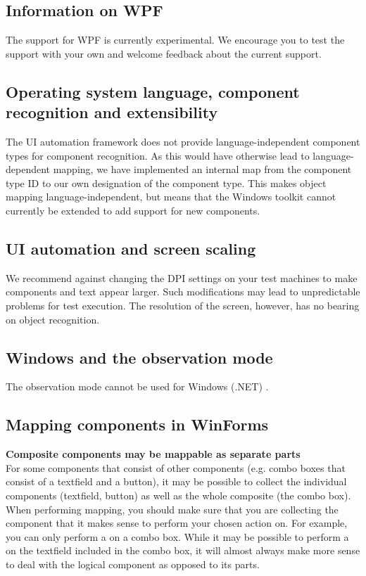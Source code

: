 \subsection{Information on WPF \gdauts{}}
The support for WPF \gdauts{} is currently experimental. We encourage you to test the support with your own \gdauts{} and welcome feedback about the current support.

\subsection{Operating system language, component recognition and extensibility}
The UI automation framework does not provide language-independent component types for component recognition. As this would have otherwise lead to language-dependent mapping, we have implemented an internal map from the component type ID to our own designation of the component type. This makes object mapping language-independent, but means that the Windows toolkit cannot currently be extended to add support for new components. 

\subsection{UI automation and screen scaling}
We recommend against changing the DPI settings on your test machines to make components and text appear larger. Such modifications may lead to unpredictable problems for test execution. The resolution of the screen, however, has no bearing on object recognition. 

\subsection{Windows \gdauts{} and the observation mode}
The observation mode cannot be used for Windows (.NET) \gdauts{}. 

\subsection{Mapping components in WinForms\gdauts{}}

\textbf{Composite components may be mappable as separate parts}\\
For some components that consist of other components (e.g. combo boxes that consist of a textfield and a button), it may be possible to collect the individual components (textfield, button) as well as the whole composite (the combo box). When performing mapping, you should make sure that you are collecting the component that it makes sense to perform your chosen action on. For example, you can only perform a  on a combo box. While it may be possible to perform a  on the textfield included in the combo box, it will almost always make more sense to deal with the logical component as opposed to its parts. 

